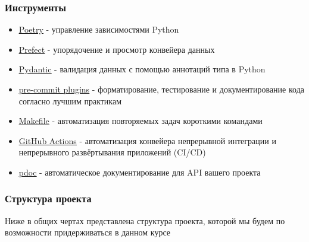 \subsubsection{Инструменты}

\begin{itemize}
	\item \href{https://python-poetry.org/}{\underline{Poetry}} - управление зависимостями Python
	\item \href{https://www.prefect.io/}{\underline{Prefect}} - упорядочение и просмотр конвейера данных
	\item \href{https://docs.pydantic.dev/}{\underline{Pydantic}} - валидация данных с помощью аннотаций типа в Python
	\item \href{https://pre-commit.com/}{\underline{pre-commit plugins}} - форматирование, тестирование и документирование кода согласно лучшим практикам
	\item \href{https://makefiletutorial.com}{\underline{Makefile}} - автоматизация повторяемых задач короткими командами
	\item \href{https://docs.github.com/en/actions}{\underline{GitHub Actions}} - автоматизация конвейера непрерывной интеграции и непрерывного развёртывания приложений (CI/CD)
	\item \href{https://github.com/pdoc3/pdoc}{\underline{pdoc}} - автоматическое документирование для API вашего проекта
\end{itemize}

\subsubsection{Структура проекта}

Ниже в общих чертах представлена структура проекта, которой мы будем по возможности придерживаться в данном курсе

